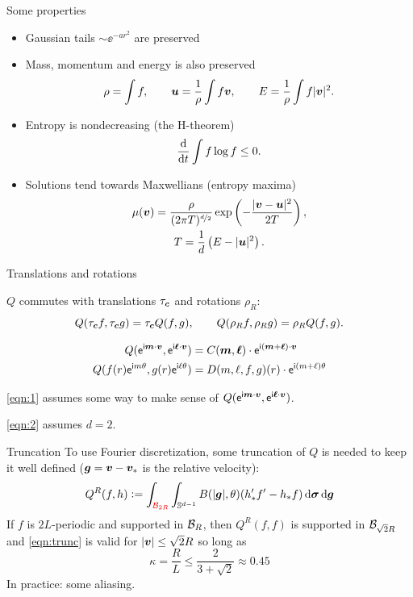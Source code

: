\documentclass[hyperref={bookmarksopen, colorlinks, linkcolor=blue, urlcolor=green, citecolor=red}, color={usenames,dvipsnames}]{beamer}
\begin{document}
\begin{frame}{Some properties}
\begin{itemize}[label=]
    \item Gaussian tails $\sim\ee^{-ar^2}$ are preserved
    \item Mass, momentum and energy is also preserved
        \[
            \rho = \int f, \qquad {\bm u} = \frac{1}{\rho} \int f {\bm v}, \qquad E = \frac{1}{\rho} \int f |{\bm v}|^2.
        \]
    \item Entropy is nondecreasing (the H-theorem)
        \[
            \frac{\text{d}}{\text{d} t} \int f \log f \leq 0.
        \]
    \item Solutions tend towards Maxwellians (entropy maxima)
        \begin{gather*}
            \mu({\bm v}) = \frac{\rho}{(2\pi T)^{\nicefrac{d}{2}}} \exp\left( -\frac{|{\bm v}-{\bm u}|^2}{2T} \right), \\
            T = \frac{1}{d}\left( E - |{\bm u}|^2 \right).
        \end{gather*}
\end{itemize}
\end{frame}

\begin{frame}{Translations and rotations}
\begin{theorem}
$Q$ commutes with translations $\tau_{\bm c}$ and rotations $\rho_R$:
\[
    Q(\tau_{\bm c} f, \tau_{\bm c} g) = \tau_{\bm c} Q(f,g), \qquad
    Q(\rho_R f, \rho_R g) = \rho_R Q(f,g).
\]
\end{theorem}
\begin{corollary}
\begin{align}
    \label{eqn:1} 
    Q(\mathsf{e}^{\mathsf{i}{\bm m}\cdot{\bm v}}, \mathsf{e}^{\mathsf{i}{\bm \ell}\cdot{\bm v}}) &= C({\bm m},{\bm \ell}) \cdot \mathsf{e}^{\mathsf{i}({\bm m}+{\bm \ell})\cdot{\bm v}} \\
    \label{eqn:2}
    Q(f(r)\mathsf{e}^{\mathsf{i} m\theta}, g(r)\mathsf{e}^{\mathsf{i} \ell\theta}) &= D(m,\ell,f,g)(r) \cdot \mathsf{e}^{\mathsf{i}(m+\ell)\theta}
\end{align}
\end{corollary}
\eqref{eqn:1} assumes some way to make sense of $Q(\mathsf{e}^{\mathsf{i}{\bm m}\cdot{\bm v}},\mathsf{e}^{\mathsf{i}{\bm \ell}\cdot{\bm v}})$.

\eqref{eqn:2} assumes $d=2$.
\end{frame}

\begin{frame}{Truncation}
To use Fourier discretization, some truncation of $Q$ is needed to keep it well defined (${\bm g}={\bm v}-{\bm v}_\ast$ is
the relative velocity):
\begin{equation} \label{eqn:trunc}
    Q^R(f,h) \vcentcolon= \int_{{\color{red}\mathcal{B}_{2R}}}\int_{\mathbb{S}^{d-1}} B(|{\bm g}|,\theta)(h_*'f'-h_*f)\,\text{d}{\bm\sigma} \,\text{d} {\bm g}
\end{equation}
If $f$ is $2L$-periodic and supported in $\mathcal{B}_R$, then $Q^R(f,f)$ is supported in $\mathcal{B}_{\sqrt{2}R}$ and
\eqref{eqn:trunc} is valid for $|{\bm v}| \leq \sqrt{2}R$ so long as
\[
    \kappa = \frac{R}{L} \leq \frac{2}{3+\sqrt{2}} \approx 0.45
\]
In practice: some aliasing.
\end{frame}
\end{document}
